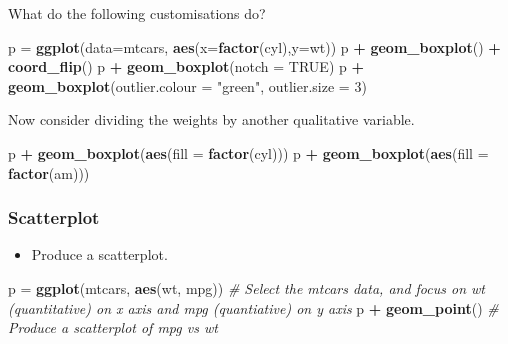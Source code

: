 \documentclass[]{article}
\newenvironment{Shaded}{\begin{snugshade}}{\end{snugshade}}
\newcommand{\CommentTok}[1]{\textcolor[rgb]{0.56,0.35,0.01}{\textit{#1}}}
\newcommand{\DataTypeTok}[1]{\textcolor[rgb]{0.13,0.29,0.53}{#1}}
\newcommand{\DecValTok}[1]{\textcolor[rgb]{0.00,0.00,0.81}{#1}}
\newcommand{\KeywordTok}[1]{\textcolor[rgb]{0.13,0.29,0.53}{\textbf{#1}}}
\newcommand{\NormalTok}[1]{#1}
\newcommand{\OperatorTok}[1]{\textcolor[rgb]{0.81,0.36,0.00}{\textbf{#1}}}
\newcommand{\OtherTok}[1]{\textcolor[rgb]{0.56,0.35,0.01}{#1}}
\newcommand{\StringTok}[1]{\textcolor[rgb]{0.31,0.60,0.02}{#1}}
\providecommand{\tightlist}{%
  \setlength{\itemsep}{0pt}\setlength{\parskip}{0pt}}
\begin{document}
What do the following customisations do?

\begin{Shaded}
\begin{Highlighting}[]
\NormalTok{p =}\StringTok{ }\KeywordTok{ggplot}\NormalTok{(}\DataTypeTok{data=}\NormalTok{mtcars, }\KeywordTok{aes}\NormalTok{(}\DataTypeTok{x=}\KeywordTok{factor}\NormalTok{(cyl),}\DataTypeTok{y=}\NormalTok{wt))}
\NormalTok{p }\OperatorTok{+}\StringTok{ }\KeywordTok{geom_boxplot}\NormalTok{() }\OperatorTok{+}\StringTok{ }\KeywordTok{coord_flip}\NormalTok{()}
\NormalTok{p }\OperatorTok{+}\StringTok{ }\KeywordTok{geom_boxplot}\NormalTok{(}\DataTypeTok{notch =} \OtherTok{TRUE}\NormalTok{)}
\NormalTok{p }\OperatorTok{+}\StringTok{ }\KeywordTok{geom_boxplot}\NormalTok{(}\DataTypeTok{outlier.colour =} \StringTok{"green"}\NormalTok{, }\DataTypeTok{outlier.size =} \DecValTok{3}\NormalTok{)}
\end{Highlighting}
\end{Shaded}

Now consider dividing the weights by another qualitative variable.

\begin{Shaded}
\begin{Highlighting}[]
\NormalTok{p }\OperatorTok{+}\StringTok{ }\KeywordTok{geom_boxplot}\NormalTok{(}\KeywordTok{aes}\NormalTok{(}\DataTypeTok{fill =} \KeywordTok{factor}\NormalTok{(cyl)))}
\NormalTok{p }\OperatorTok{+}\StringTok{ }\KeywordTok{geom_boxplot}\NormalTok{(}\KeywordTok{aes}\NormalTok{(}\DataTypeTok{fill =} \KeywordTok{factor}\NormalTok{(am)))}
\end{Highlighting}
\end{Shaded}

\hypertarget{scatterplot-1}{%
\subsubsection{Scatterplot}\label{scatterplot-1}}

\begin{itemize}
\tightlist
\item
  Produce a scatterplot.
\end{itemize}

\begin{Shaded}
\begin{Highlighting}[]
\NormalTok{p =}\StringTok{ }\KeywordTok{ggplot}\NormalTok{(mtcars, }\KeywordTok{aes}\NormalTok{(wt, mpg)) }\CommentTok{# Select the mtcars data, and focus on wt (quantitative) on x axis and mpg (quantiative) on y axis}
\NormalTok{p }\OperatorTok{+}\StringTok{ }\KeywordTok{geom_point}\NormalTok{()  }\CommentTok{# Produce a scatterplot of mpg vs wt}
\end{Highlighting}
\end{Shaded}
\end{document}

